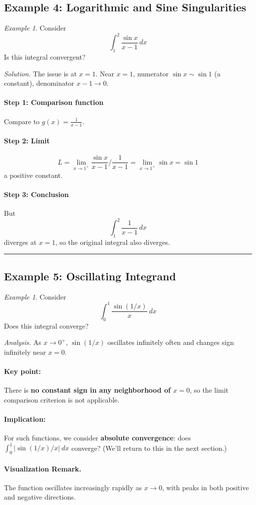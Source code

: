 \documentclass[12pt]{article}
\theoremstyle{definition}
\theoremstyle{plain}
\theoremstyle{remark}
\newtheorem{example}[definition]{Example}
\begin{document}
\subsection{Example 4: Logarithmic and Sine Singularities}
\begin{example}
Consider
\[
\int_1^{2} \frac{\sin x}{x - 1}\,dx
\]
Is this integral convergent?

\emph{Solution.} The issue is at $x=1$. Near $x=1$, numerator $\sin x \sim \sin 1$ (a constant), denominator $x-1 \to 0$.

\paragraph{Step 1: Comparison function}
Compare to $g(x) = \frac{1}{x-1}$.

\paragraph{Step 2: Limit}
\[
L = \lim_{x\to1^+} \frac{\sin x}{x-1} \bigg/ \frac{1}{x-1} 
= \lim_{x\to1^+} \sin x = \sin 1
\]
a positive constant.

\paragraph{Step 3: Conclusion}
But
\[
\int_1^2 \frac{1}{x-1}\,dx
\]
diverges at $x=1$, so the original integral also diverges.
\end{example}

\hrule

\subsection{Example 5: Oscillating Integrand}
\begin{example}
Consider
\[
\int_0^1 \frac{\sin(1/x)}{x}~dx
\]
Does this integral converge?

\emph{Analysis.} As $x\to0^+$, $\sin(1/x)$ oscillates infinitely often and changes sign infinitely near $x=0$.

\paragraph{Key point:} There is \textbf{no constant sign in any neighborhood of $x=0$}, so the limit comparison criterion is not applicable.

\paragraph{Implication:} For such functions, we consider \textbf{absolute convergence}: does $\int_0^1 |\sin(1/x)/x|~dx$ converge? (We'll return to this in the next section.)

\paragraph{Visualization Remark.} The function oscillates increasingly rapidly as $x \to 0$, with peaks in both positive and negative directions.
\end{example}
\end{document}
